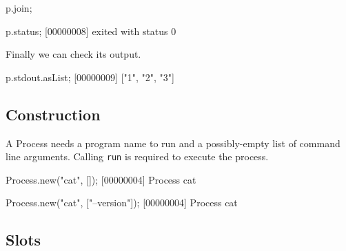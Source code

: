 \begin{urbiscript}
p.join;

p.status;
[00000008] exited with status 0
\end{urbiscript}

\noindent
Finally we can check its output.

\begin{urbiscript}
p.stdout.asList;
[00000009] ["1", "2", "3"]
\end{urbiscript}

\subsection{Construction}

A Process needs a program name to run and a possibly-empty list of
command line arguments.  Calling \lstinline|run| is required to
execute the process.

\begin{urbiscript}
Process.new("cat", []);
[00000004] Process cat

Process.new("cat", ["--version"]);
[00000004] Process cat
\end{urbiscript}

\subsection{Slots}

